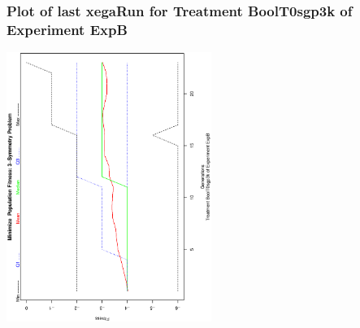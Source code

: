  \begin{frame}
 \frametitle{ Plot of last xegaRun for Treatment BoolT0sgp3k of Experiment ExpB }
 \begin{center}
\includegraphics[width=0.5\textwidth, angle=-90]
{ExpBPlotPopStatsFigure001.eps}
 \end{center}
 \label{report/ExpBPlotPopStatsFigure001.eps}  
 \end{frame}

